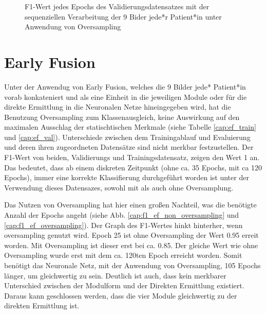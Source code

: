 \begin{figure}[b]\centering
\makebox[0pt]{}
\caption[F1-Wert jedes Epochs des Validierungsdatensatzes mit der sequenziellen Verarbeitung unter Anwendung von Sampling]{F1-Wert jedes Epochs des Validierungsdatensatzes mit der sequenziellen Verarbeitung der 9 Bider jede*r Patient*in unter Anwendung von Oversampling}\label{cap:f1_sequential_oversampling}
\end{figure}\label{fig:f1_sequential_oversampling}





\clearpage
\section{Early Fusion}\label{earlyfusion}

Unter der Anwendug von Early Fusion, welches die 9 Bilder jede* Patient*in vorab konkateniert und als eine Einheit in die jeweiligen Module oder für die direkte Ermittlung in die Neuronalen Netze hineingegeben wird, hat die Benutzung Oversampling zum Klassenausgleich, keine Auswirkung auf den maximalen Ausschlag der statischtischen Merkmale (siehe Tabelle \ref{cap:ef_train} und \ref{cap:ef_val}). Unterschiede zwischen dem Trainingablauf und Evaluierung und deren ihren zugeordneten Datensätze sind nicht merkbar festzustellen. Der F1-Wert von beiden, Validierungs und Trainingsdatensatz, zeigen den Wert 1 an. Das bedeutet, dass ab einem diskreten Zeitpunkt (ohne ca. 35 Epochs, mit ca 120 Epochs), immer eine korrekte Klassifierung durchgeführt worden ist unter der Verwendung dieses Datensazes, sowohl mit als auch ohne Oversamplung.

Das Nutzen von Oversampling hat hier einen großen Nachteil, was die benötigte Anzahl der Epochs angeht (siehe Abb. \ref{cap:f1_ef_non_oversampling} und \ref{cap:f1_ef_oversampling}). Der Graph des F1-Wertes hinkt hinterher, wenn oversampling genutzt wird. Epoch 25 ist ohne Oversampling der Wert 0.95 erreit worden. Mit Oversampling ist dieser erst bei ca. 0.85. Der gleiche Wert wie ohne Oversampling wurde erst mit dem ca. 120ten Epoch erreicht worden. Somit benötigt das Neuronale Netz, mit der Anwendung von Oversampling, 105 Epochs länger, um gleichwertig zu sein. Deutlich ist auch, dass kein merkbarer Unterschied zwischen der Modulform und der Direkten Ermittlung existiert. Daraus kann geschlossen werden, dass die vier Module gleichwertig zu der direkten Ermittlung ist.

